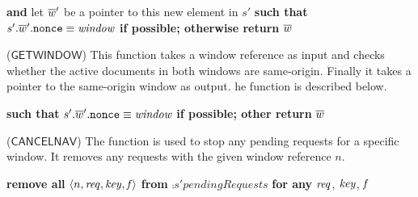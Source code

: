 \begin{algorithmic}[1]
      \ELSE
      \ENDIF
       \textbf{and} let
      $\overline{w}'$ be a pointer to this new element in $s'$
    \ENDIF
     \textbf{such that} ${{s'}.\overline{w}'}.\mathtt{nonce} \equiv
      \mathit{window}$ \textbf{if possible; otherwise return} $\overline{w}$ 
  \EndFunction
\end{algorithmic} \setlength{\parindent}{1em}

\begin{definition}($\mathsf{GETWINDOW}$)
This function takes a window reference as input
and checks whether the active documents in both windows are
same-origin. Finally it takes a pointer to the same-origin window as output. he function is described below.
\end{definition}

\begin{algorithmic}[1]
     \textbf{such that} ${{s'}.\overline{w}'}.\mathtt{nonce} \equiv \mathit{window}$ \textbf{if possible; other return} $\overline{w}$
    \ENDIF
  \EndFunction
\end{algorithmic} \setlength{\parindent}{1em}




\begin{definition}($\mathsf{CANCELNAV}$)
The function is used to stop any pending requests for a specific window.  It removes any requests with the given window reference $n$.
\end{definition}

\begin{algorithmic}[1]
    \State \textbf{remove all} $\langle n, \mathit{req}, \mathit{key}, \mathit{f}\rangle$ \textbf{ from } $\comp{s'}{pendingRequests}$ \textbf{for any} $\mathit{req}$, $\mathit{key}$, $\mathit{f}$
  \EndFunction
\end{algorithmic} \setlength{\parindent}{1em}




